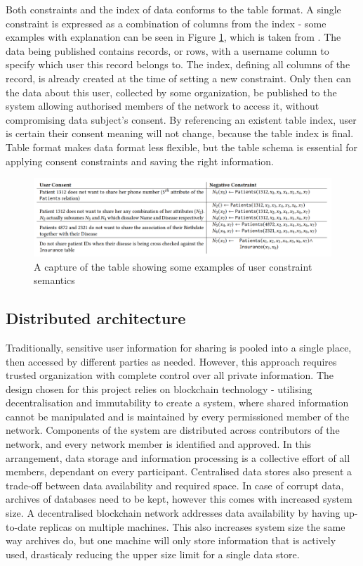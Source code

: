 \documentclass[12pt]{article}
\begin{document}
    Both constraints and the index of data conforms to the table format. A single constraint is expressed as a combination of columns from the index - some examples with explanation can be seen in Figure \ref{fig:constraints}, which is taken from \cite{konstantinidis}. The data being published contains records, or rows, with a username column to specify which user this record belongs to. The index, defining all columns of the record, is already created at the time of setting a new constraint. Only then can the data about this user, collected by some organization, be published to the system allowing authorised members of the network to access it, without compromising data subject's consent. By referencing an existent table index, user is certain their consent meaning will not change, because the table index is final. Table format makes data format less flexible, but the table schema is essential for applying consent constraints and saving the right information.

    \begin{figure}[H]
        \includegraphics[width=\textwidth]{constraints.png}
        \caption{A capture of the table showing some examples of user constraint semantics}
        \label{fig:constraints}
    \end{figure}


    \subsection{Distributed architecture}
    Traditionally, sensitive user information for sharing is pooled into a single place, then accessed by different parties as needed. However, this approach requires trusted organization with complete control over all private information. The design chosen for this project relies on blockchain technology - utilising decentralisation and immutability to create a system, where shared information cannot be manipulated and is maintained by every permissioned member of the network. Components of the system are distributed across contributors of the network, and every network member is identified and approved. In this arrangement, data storage and information processing is a collective effort of all members, dependant on every participant. Centralised data stores also present a trade-off between data availability and required space. In case of corrupt data, archives of databases need to be kept, however this comes with increased system size. A decentralised blockchain network addresses data availability by having up-to-date replicas on multiple machines. This also increases system size the same way archives do, but one machine will only store information that is actively used, drasticaly reducing the upper size limit for a single data store.
\end{document}
